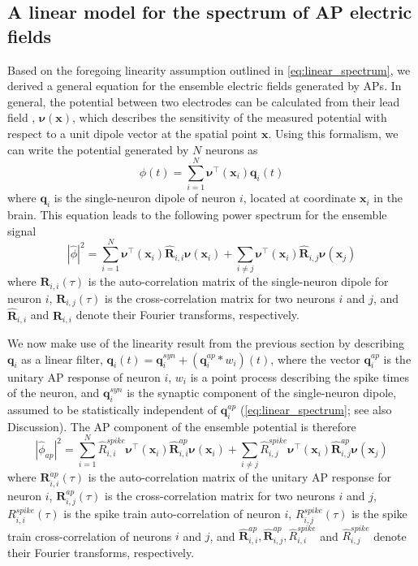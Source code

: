 \subsection{A linear model for the spectrum of AP electric fields}
Based on the foregoing linearity assumption outlined in {\ref{eq:linear_spectrum}}, we derived a general equation for the ensemble electric fields generated by APs. In general, the potential between two electrodes can be calculated from their lead field \cite{Malmivuo1995}, $\bm{\nu}(\bm{x})$, which describes the sensitivity of the measured potential with respect to a unit dipole vector at the spatial point $\bm{x}$. Using this formalism, we can write the potential generated by $N$ neurons as 
\begin{equation}
    \phi(t) = \sum_{i=1}^N \bm{\nu}^\intercal(\bm{x}_i) \bm{q}_i(t)
\end{equation}
where $\bm{q}_i$ is the single-neuron dipole of neuron $i$, located at coordinate $\bm{x}_i$ in the brain. This equation leads to the following power spectrum for the ensemble signal
\begin{equation} \label{eq:apEEG_spectrum}
    |\hat{\phi}|^2 = \sum_{i=1}^N \bm{\nu}^\intercal(\bm{x}_i) \hat{\bm{R}}_{i,i} \bm{\nu}(\bm{x}_i) + \sum_{i\ne j} \bm{\nu}^\intercal(\bm{x}_i) \hat{\bm{R}}_{i,j}\bm{\nu}(\bm{x}_j)
\end{equation}
where $\bm{R}_{i,i}(\tau)$ is the auto-correlation matrix of the single-neuron dipole for neuron $i$, $\bm{R}_{i,j}(\tau)$ is the cross-correlation matrix for two neurons $i$ and $j$, and $\hat{\bm{R}}_{i,i}$ and $\hat{\bm{R}}_{i,i}$ denote their Fourier transforms, respectively.

We now make use of the linearity result from the previous section by describing $\bm{q}_i$ as a linear filter, $\bm{q}_i(t)=\bm{q}_i^{syn}+(\bm{q}^{ap}_i*w_i)(t)$, where the vector $\bm{q}^{ap}_i$ is the unitary AP response of neuron $i$, $w_i$ is a point process describing the spike times of the neuron, and $\bm{q}^{syn}_i$ is the synaptic component of the single-neuron dipole, assumed to be statistically independent of $\bm{q}^{ap}_i$ ({\ref{eq:linear_spectrum}}; see also Discussion). The AP component of the ensemble potential is therefore
\begin{equation} \label{eq:apEEG_spectrum2}
    |\hat{\phi}_{ap}|^2 = \sum_{i=1}^N \hat{R}_{i,i}^{spike} \bm{\nu}^\intercal(\bm{x}_i) \hat{\bm{R}}^{ap}_{i,i} \bm{\nu}(\bm{x}_i) + \sum_{i\ne j} \hat{R}^{spike}_{i,j}\bm{\nu}^\intercal(\bm{x}_i) \hat{\bm{R}}^{ap}_{i,j}\bm{\nu}(\bm{x}_j)
\end{equation}
where $\bm{R}^{ap}_{i,i}(\tau)$ is the auto-correlation matrix of the unitary AP response for neuron $i$, $\bm{R}^{ap}_{i,j}(\tau)$ is the cross-correlation matrix for two neurons $i$ and $j$, $R_{i,i}^{spike}(\tau)$ is the spike train auto-correlation of neuron $i$, $R_{i,j}^{spike}(\tau)$ is the spike train cross-correlation of neurons $i$ and $j$, and $\hat{\bm{R}}^{ap}_{i,i}, \hat{\bm{R}}^{ap}_{i,j}, \hat{R}_{i,i}^{spike}$ and $\hat{R}^{spike}_{i,j}$ denote their Fourier transforms, respectively.


